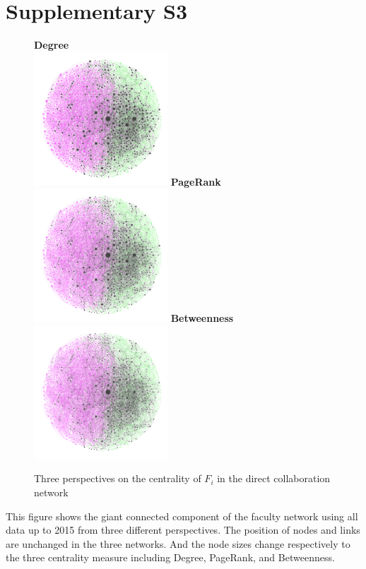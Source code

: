 \documentclass[10pt]{article}         %
\begin{document}
\newpage
\section{Supplementary S3}
\begin{figure}[!htb]
    \textbf{Degree}\\
    \includegraphics[width=5cm, height=5cm]{S3Degree.png}
  \endminipage\hfill
    \textbf{PageRank}\\
    \includegraphics[width=5cm, height=5cm]{S3PageRank.png}
  \endminipage\hfill
    \textbf{Betweenness}\\
    \includegraphics[width=5cm, height=5cm]{S3Betweeness.png}
  \endminipage
  \caption{Three perspectives on the centrality of $F_i$ in the direct collaboration network}
  \label{fig:s3}
\end{figure}

This figure shows the giant connected component of the faculty network using all data up to 2015 from three different perspectives. The position of nodes and links are unchanged in the three networks. And the node sizes change respectively to the three centrality measure including Degree, PageRank, and Betweenness.
\end{document}
